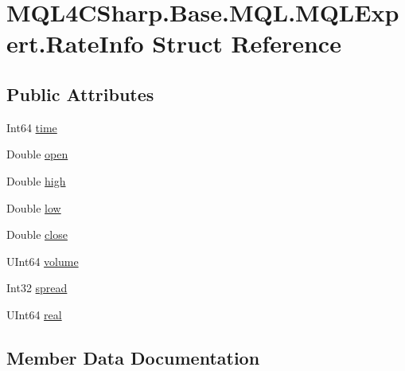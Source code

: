 \hypertarget{struct_m_q_l4_c_sharp_1_1_base_1_1_m_q_l_1_1_m_q_l_expert_1_1_rate_info}{}\section{M\+Q\+L4\+C\+Sharp.\+Base.\+M\+Q\+L.\+M\+Q\+L\+Expert.\+Rate\+Info Struct Reference}
\label{struct_m_q_l4_c_sharp_1_1_base_1_1_m_q_l_1_1_m_q_l_expert_1_1_rate_info}
\subsection*{Public Attributes}
\begin{DoxyCompactItemize}
\item 
Int64 \hyperlink{struct_m_q_l4_c_sharp_1_1_base_1_1_m_q_l_1_1_m_q_l_expert_1_1_rate_info_ae41ed969d47d81057cf5d3c353aa2758}{time}
\item 
Double \hyperlink{struct_m_q_l4_c_sharp_1_1_base_1_1_m_q_l_1_1_m_q_l_expert_1_1_rate_info_afa002cca417ab091e626fcb360af1608}{open}
\item 
Double \hyperlink{struct_m_q_l4_c_sharp_1_1_base_1_1_m_q_l_1_1_m_q_l_expert_1_1_rate_info_a652df363c3618ac213a917032b235664}{high}
\item 
Double \hyperlink{struct_m_q_l4_c_sharp_1_1_base_1_1_m_q_l_1_1_m_q_l_expert_1_1_rate_info_a204d89df18cbf6af013ecddd47e95277}{low}
\item 
Double \hyperlink{struct_m_q_l4_c_sharp_1_1_base_1_1_m_q_l_1_1_m_q_l_expert_1_1_rate_info_a697d949721e73a59feee6c8ac3e55c95}{close}
\item 
U\+Int64 \hyperlink{struct_m_q_l4_c_sharp_1_1_base_1_1_m_q_l_1_1_m_q_l_expert_1_1_rate_info_a4909b697563b89b879645dfa5a2a6aba}{volume}
\item 
Int32 \hyperlink{struct_m_q_l4_c_sharp_1_1_base_1_1_m_q_l_1_1_m_q_l_expert_1_1_rate_info_a33dc9506c8a68f8530c1fda3835fe49a}{spread}
\item 
U\+Int64 \hyperlink{struct_m_q_l4_c_sharp_1_1_base_1_1_m_q_l_1_1_m_q_l_expert_1_1_rate_info_ab94a352b667fd71f11f7d53096ba3f76}{real}
\end{DoxyCompactItemize}


\subsection{Member Data Documentation}
